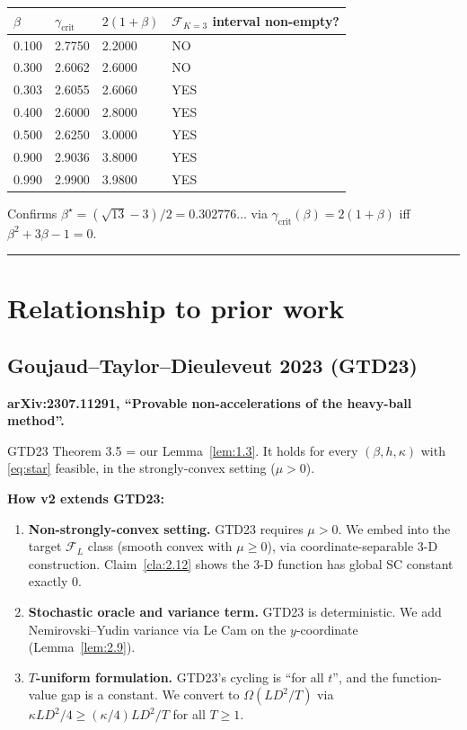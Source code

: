 \documentclass[11pt,a4paper]{article}
\theoremstyle{plain}
\theoremstyle{definition}
\theoremstyle{remark}
\newcommand{\F}{\mathcal{F}}
\begin{document}
\begin{center}
\begin{tabular}{@{}llll@{}}
\toprule
$\beta$ & $\gamma_\mathrm{crit}$ & $2(1+\beta)$ & $\F_{K=3}$ interval non-empty? \\
\midrule
0.100 & 2.7750 & 2.2000 & NO  \\
0.300 & 2.6062 & 2.6000 & NO  \\
0.303 & 2.6055 & 2.6060 & YES \\
0.400 & 2.6000 & 2.8000 & YES \\
0.500 & 2.6250 & 3.0000 & YES \\
0.900 & 2.9036 & 3.8000 & YES \\
0.990 & 2.9900 & 3.9800 & YES \\
\bottomrule
\end{tabular}
\end{center}

Confirms $\beta^\star = (\sqrt{13} - 3)/2 = 0.302776\ldots$ via $\gamma_\mathrm{crit}(\beta) = 2(1+\beta)$ iff $\beta^2 + 3\beta - 1 = 0$.

\bigskip
\hrule
\bigskip

\section{Relationship to prior work}

\subsection{Goujaud--Taylor--Dieuleveut 2023 (GTD23)}

\textbf{arXiv:2307.11291, ``Provable non-accelerations of the heavy-ball method''.}

GTD23 Theorem 3.5 = our Lemma~\ref{lem:1.3}. It holds for every $(\beta, h, \kappa)$ with \eqref{eq:star} feasible, in the strongly-convex setting ($\mu > 0$).

\textbf{How v2 extends GTD23:}
\begin{enumerate}
\item \textbf{Non-strongly-convex setting.} GTD23 requires $\mu > 0$. We embed into the target $\F_L$ class (smooth convex with $\mu \geq 0$), via coordinate-separable 3-D construction. Claim~\ref{cla:2.12} shows the 3-D function has global SC constant exactly $0$.
\item \textbf{Stochastic oracle and variance term.} GTD23 is deterministic. We add Nemirovski--Yudin variance via Le Cam on the $y$-coordinate (Lemma~\ref{lem:2.9}).
\item \textbf{$T$-uniform formulation.} GTD23's cycling is ``for all $t$'', and the function-value gap is a constant. We convert to $\Omega(LD^2/T)$ via $\kappa LD^2/4 \geq (\kappa/4)LD^2/T$ for all $T \geq 1$.
\end{enumerate}
\end{document}
